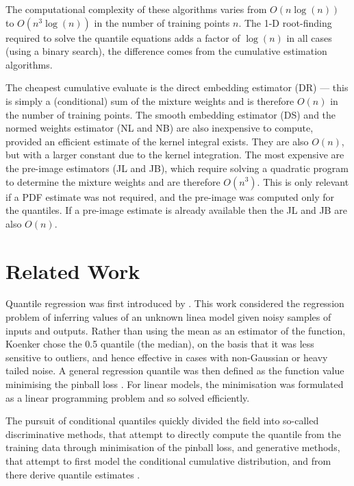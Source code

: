 \documentclass[twoside]{article} \usepackage{aistats2017}
\theoremstyle{definition}
\begin{document}
		
	The computational complexity of these algorithms varies from $O(n \log(n))$ to $O(n^{3} \log(n))$ in the number of training points $n$. The 1-D root-finding required to solve the quantile equations adds a factor of $\log(n)$ in all cases (using a binary search), the difference comes from the cumulative estimation algorithms.
	
	The cheapest cumulative evaluate is the direct embedding estimator (DR) --- this is simply a (conditional) sum of the mixture weights and is therefore $O(n)$ in the number of training points. The smooth embedding estimator (DS) and the normed weights estimator (NL and NB) are also inexpensive to compute, provided an efficient estimate of the kernel integral exists. They are also $O(n)$, but with a larger constant due to the kernel integration. The most expensive are the pre-image estimators (JL and JB), which require solving a quadratic program to determine the mixture weights and are therefore $O(n^3)$. This is only relevant if a PDF estimate was not required, and the pre-image was computed only for the quantiles. If a pre-image estimate is already available then the JL and JB are also $O(n)$.
	
\section{Related Work}
\label{sec:related_work}

	Quantile regression was first introduced by \cite{Koenker1978}. This work considered the regression problem of inferring values of an unknown linea model given noisy samples of inputs and outputs. Rather than using the mean as an estimator of the function, Koenker chose the 0.5 quantile (the median), on the basis that it was less sensitive to outliers, and hence effective in cases with non-Gaussian or heavy tailed noise. A general regression quantile was then defined as the function value minimising the pinball loss \citep{Koenker1978}. For linear models, the minimisation was formulated as a linear programming problem and so solved efficiently.
	
	The pursuit of conditional quantiles quickly divided the field into so-called discriminative methods, that attempt to directly compute the quantile from the training data through minimisation of the pinball loss, and generative methods, that attempt to first model the conditional cumulative distribution, and from there derive quantile estimates \citep{Koenker2005}.
	
\end{document}
